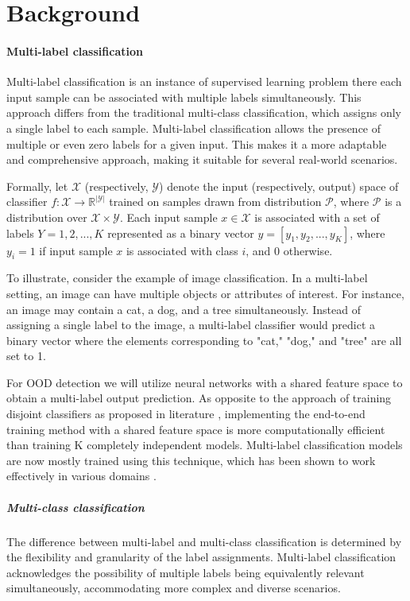 \section{Background}\label{background}
\paragraph{Multi-label classification} 
Multi-label classification is an instance of supervised learning problem there each input sample can be associated with multiple labels simultaneously. 
This approach differs from the traditional multi-class classification, which assigns only a single label to each sample. 
Multi-label classification allows the presence of multiple or even zero labels for a given input. 
This makes it a more adaptable and comprehensive approach, making it suitable for several real-world scenarios.

Formally, let $\mathcal{X}$ (respectively, $\mathcal{Y}$) denote the input (respectively, output) space of classifier $f : \mathcal{X} \rightarrow \mathbb{R}^{|\mathcal{Y}|}$ 
trained on samples drawn from distribution $\mathcal{P}$, where $\mathcal{P}$ is a distribution over $\mathcal{X} \times \mathcal{Y}$. 
Each input sample $x \in \mathcal{X}$ is associated with a set of labels $Y = {1, 2, ... , K}$ represented as a binary vector $y = [y_1, y_2, ... , y_K]$, where $y_i = 1$ if input sample $x$ is associated with class $i$, and 0 otherwise.

To illustrate, consider the example of image classification. In a multi-label setting, an image can have multiple objects or attributes of interest. For instance, an image may contain a cat, a dog, and a tree simultaneously. Instead of assigning a single label to the image, a multi-label classifier would predict a binary vector where the elements corresponding to "cat," "dog," and "tree" are all set to 1.

For OOD detection we will utilize neural networks with a shared feature space to obtain a multi-label output prediction. 
As opposite to the approach of training disjoint classifiers as proposed in literature \cite{Tsoumakas2007}, implementing the end-to-end training method with a shared feature space is more computationally efficient than training K completely independent models. 
Multi-label classification models are now mostly trained using this technique, which has been shown to work effectively in various domains \cite{Zhang2017} \cite{Trohidis2011} \cite{Wang2017}.

\subparagraph{Multi-class classification} 
The difference between multi-label and multi-class classification \cite{dosovitskiyImageWorth16x162021} is determined by the flexibility and granularity of the label assignments. Multi-label classification acknowledges the possibility of multiple labels being equivalently relevant simultaneously, accommodating more complex and diverse scenarios. 

